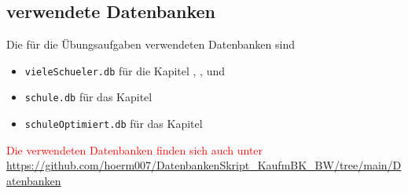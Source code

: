 \subsection[verwendete Datenbanken]{verwendete Datenbanken}
Die für die Übungsaufgaben verwendeten Datenbanken sind
\begin{itemize}
	\item \lstinline!vieleSchueler.db! für die Kapitel ,  ,  und 
	\item \lstinline!schule.db! für das Kapitel 
	\item \lstinline!schuleOptimiert.db! für das Kapitel 
\end{itemize}
\textcolor{red}{Die verwendeten Datenbanken finden sich auch unter
    {\href{https://github.com/hoerm007/DatenbankenSkript\_KaufmBK\_BW/tree/main/Datenbanken}{https://github.com/hoerm007/DatenbankenSkript\_KaufmBK\_BW/tree/main/Datenbanken}}}
\newpage\pagestyle{empty}
